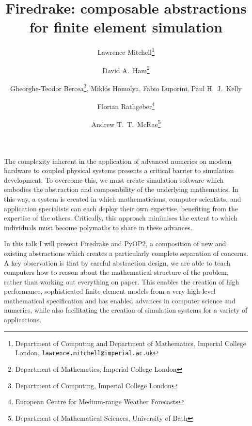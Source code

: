 \documentclass{article}
\begin{document}
\title{Firedrake: composable abstractions for finite element simulation}

\author{%
  Lawrence Mitchell\thanks{Department of Computing and Department of Mathematics, Imperial College London,
    \texttt{lawrence.mitchell@imperial.ac.uk}}
  \and
  David A.~Ham\thanks{Department of Mathematics, Imperial College London}
  \and
  Gheorghe-Teodor Bercea\thanks{Department of Computing, Imperial
    College London}, 
  Mikl\'os Homolya\footnotemark[3], Fabio Luporini\footnotemark[3], Paul
  H.~J.~Kelly\footnotemark[3]
  \and
  Florian Rathgeber\thanks{European Centre for Medium-range Weather
    Forecasts}
  \and
  Andrew T.~T.~McRae\thanks{Department of Mathematical Sciences, University of Bath}
}
\maketitle

The complexity inherent in the application of advanced numerics on
modern hardware to coupled physical systems presents a critical
barrier to simulation development.  To overcome this, we must create
simulation software which embodies the abstraction and composability
of the underlying mathematics.  In this way, a system is created in
which mathematicians, computer scientists, and application specialists
can each deploy their own expertise, benefiting from the expertise of
the others.  Critically, this approach minimises the extent to which
individuals must become polymaths to share in these advances.

In this talk I will present Firedrake and PyOP2, a composition of new
and existing abstractions which creates a particularly complete
separation of concerns.  A key observation is that by careful
abstraction design, we are able to teach computers how to reason about
the mathematical structure of the problem, rather than working out
everything on paper.  This enables the creation of high performance,
sophisticated finite element models from a very high level
mathematical specification and has enabled advances in computer
science and numerics, while also facilitating the creation of
simulation systems for a variety of applications.
\end{document}

